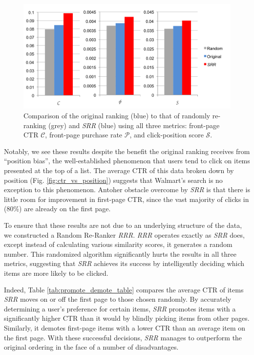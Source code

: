 \documentclass{article}
\begin{document}
\begin{figure}[htbp!]
    \centering
    \includegraphics[width=\textwidth]{moneyshot.png}
    \caption{Comparison of the original ranking (blue) to that of randomly re-ranking (grey) and {\em SRR} (blue) using all three metrics: front-page CTR $\mathscr{C}$, front-page purchase rate $\mathscr{P}$, and click-position score $\mathscr{S}$.}
    \label{fig:compare_metric_performance}
\end{figure}

Notably, we see these results despite the benefit the original ranking receives
from “position bias”, the well-established phenomenon that users tend to click
on items presented at the top of a list. The average CTR of this data broken
down by position (Fig. \ref{fig:ctr_vs_position}) suggests that Walmart’s search 
is no exception to this phenomenon. Antoher obstacle overcome by {\em SRR} is
that there is little room for improvement in first-page CTR, since the vast majority 
of clicks in {\chi} (80\%) are already on the first page.

To ensure that these results are not due to an underlying structure of the
data, we constructed a Random Re-Ranker {\em RRR}. {\em RRR} operates exactly
as {\em SRR} does, except instead of calculating various similarity
scores, it generates a random number. This randomized algorithm significantly
hurts the results in all three metrics, suggesting that {\em SRR}
achieves its success by intelligently deciding which items are more likely to be
clicked. 

Indeed, Table \ref{tab:promote_demote_table} compares the average
CTR of items {\em SRR} moves on or off the first page to those chosen randomly. 
By accurately determining a user’s preference for certain items, {\em SRR} promotes items with a
significantly higher CTR than it would by blindly picking items from other pages. 
Similarly, it demotes first-page items with a lower CTR than an average item on
the first page. With these successful decisions, {\em SRR} manages to outperform the original
ordering in the face of a number of disadvantages.
\end{document}
